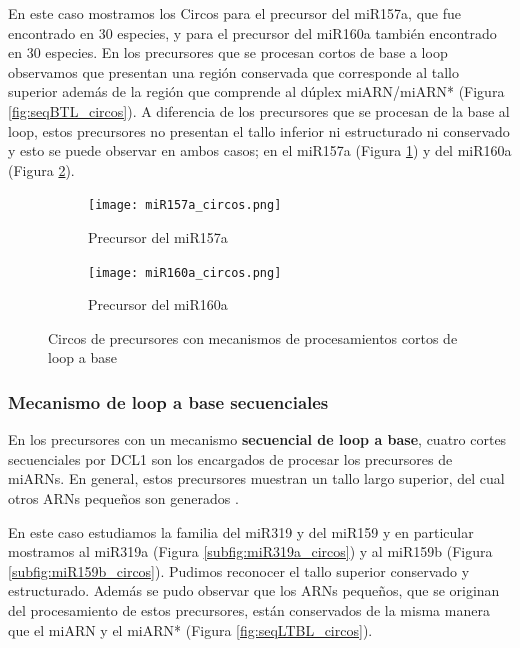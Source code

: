 En este caso mostramos los Circos para el precursor del miR157a, que fue encontrado en 30 especies, y para el precursor del miR160a también encontrado en 30 especies. 
En los precursores que se procesan cortos de base a loop observamos que presentan una región conservada que corresponde al tallo superior además de la región que comprende al dúplex miARN/miARN* (Figura \ref{fig:seqBTL_circos}).
A diferencia de los precursores que se procesan de la base al loop, estos precursores no presentan el tallo inferior ni estructurado ni conservado y esto se puede observar en ambos casos; en el miR157a (Figura \ref{subfig:miR157a_circos}) y del miR160a (Figura \ref{subfig:miR160a_circos}).


\begin{landscape}
	\begin{figure}
	\centering
	\begin{subfigure}{.75\textwidth}
	  \centering
	  \texttt{[image: miR157a\_circos.png]}
	  \caption{Precursor del miR157a}
	  \label{subfig:miR157a_circos}
	\end{subfigure}%
	\begin{subfigure}{.75\textwidth}
	  \centering
	  \texttt{[image: miR160a\_circos.png]}
	  \caption{Precursor del miR160a}
	  \label{subfig:miR160a_circos}
	\end{subfigure}
	\caption{Circos de precursores con mecanismos de procesamientos cortos de loop a base}
	\label{fig:srLTB_circos}
	\end{figure}
\end{landscape}

\subsubsection{Mecanismo de loop a base secuenciales}

En los precursores con un mecanismo \textbf{secuencial de loop a base}, cuatro cortes secuenciales por DCL1 son los encargados de procesar los precursores de miARNs.
En general, estos precursores muestran un tallo largo superior, del cual otros ARNs pequeños son generados \citep{pmid19850910,Bologna2009,Bologna2013}.

En este caso estudiamos la familia del miR319 y del miR159 y en particular mostramos al miR319a (Figura \ref{subfig:miR319a_circos}) y al miR159b (Figura \ref{subfig:miR159b_circos}).
Pudimos reconocer el tallo superior conservado y estructurado.
Además se pudo observar que los ARNs pequeños, que se originan del procesamiento de estos precursores, están conservados de la misma manera que el miARN y el miARN* (Figura \ref{fig:seqLTBL_circos}).

